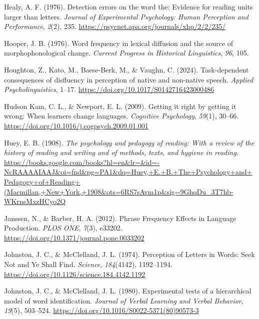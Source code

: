 \documentclass[
  12pt,
  letterpaper,
]{scrreport}
\newlength{\cslhangindent}
\newenvironment{CSLReferences}[2] %
 {\begin{list}{}{%
  \setlength{\itemindent}{0pt}
  \setlength{\leftmargin}{0pt}
  \setlength{\parsep}{0pt}
  \ifodd #1
   \setlength{\leftmargin}{\cslhangindent}
   \setlength{\itemindent}{-1\cslhangindent}
  \fi
  \setlength{\itemsep}{#2\baselineskip}}}
 {\end{list}}
\begin{document}
\begin{CSLReferences}{1}{0}
Healy, A. F. (1976). Detection errors on the word the: Evidence for
reading units larger than letters. \emph{Journal of Experimental
Psychology: Human Perception and Performance}, \emph{2}(2), 235.
\url{https://psycnet.apa.org/journals/xhp/2/2/235/}

Hooper, J. B. (1976). Word frequency in lexical diffusion and the source
of morphophonological change. \emph{Current Progress in Historical
Linguistics}, \emph{96}, 105.

Houghton, Z., Kato, M., Baese-Berk, M., \& Vaughn, C. (2024).
Task-dependent consequences of disfluency in perception of native and
non-native speech. \emph{Applied Psycholinguistics}, 1--17.
\url{https://doi.org/10.1017/S0142716423000486}

Hudson Kam, C. L., \& Newport, E. L. (2009). Getting it right by getting
it wrong: When learners change languages. \emph{Cognitive Psychology},
\emph{59}(1), 30--66.
\url{https://doi.org/10.1016/j.cogpsych.2009.01.001}

Huey, E. B. (1908). \emph{The psychology and pedagogy of reading: With a
review of the history of reading and writing and of methods, texts, and
hygiene in reading}.
\url{https://books.google.com/books?hl=en&lr=&id=-NcRAAAAIAAJ&oi=fnd&pg=PA1&dq=Huey,+E.+B.+The+Psychology+and+Pedagogy+of+Reading+(Macmillan,+New+York,+1908&ots=6RS7sAvm1p&sig=9GhqDu_3T7hb-WKrnsMxzHCyo2Q}

Janssen, N., \& Barber, H. A. (2012). Phrase Frequency Effects in
Language Production. \emph{PLOS ONE}, \emph{7}(3), e33202.
\url{https://doi.org/10.1371/journal.pone.0033202}

Johnston, J. C., \& McClelland, J. L. (1974). Perception of Letters in
Words: Seek Not and Ye Shall Find. \emph{Science}, \emph{184}(4142),
1192--1194. \url{https://doi.org/10.1126/science.184.4142.1192}

Johnston, J. C., \& McClelland, J. L. (1980). Experimental tests of a
hierarchical model of word identification. \emph{Journal of Verbal
Learning and Verbal Behavior}, \emph{19}(5), 503--524.
\url{https://doi.org/10.1016/S0022-5371(80)90573-3}


\end{CSLReferences}
\end{document}
